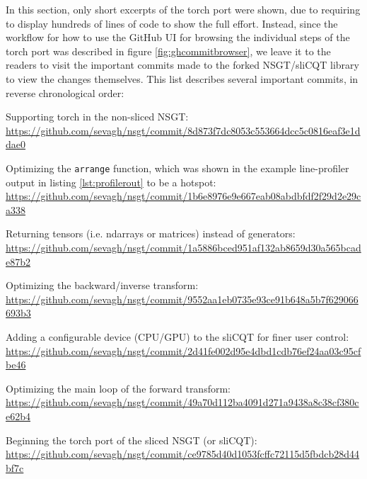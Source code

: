 \documentclass[report.tex]{subfiles}
\begin{document}
In this section, only short excerpts of the torch port were shown, due to requiring to display hundreds of lines of code to show the full effort. Instead, since the workflow for how to use the GitHub UI for browsing the individual steps of the torch port was described in figure \ref{fig:ghcommitbrowser}, we leave it to the readers to visit the important commits made to the forked NSGT/sliCQT library to view the changes themselves. This list describes several important commits, in reverse chronological order:

\begin{tight_enumerate}
	\item
		Supporting torch in the non-sliced NSGT:\\
		{\scriptsize \url{https://github.com/sevagh/nsgt/commit/8d873f7dc8053c553664dcc5c0816eaf3e1ddae0}}
	\item
		 Optimizing the \Verb#arrange# function, which was shown in the example line-profiler output in listing \ref{lst:profilerout} to be a hotspot:\\
		 {\scriptsize \url{https://github.com/sevagh/nsgt/commit/1b6e8976e9e667eab08abdbfdf2f29d2e29ca338}}
	 \item
		 Returning tensors (i.e. ndarrays or matrices) instead of generators:\\
		 {\scriptsize \url{https://github.com/sevagh/nsgt/commit/1a5886bced951af132ab8659d30a565bcade87b2}}
	 \item
		 Optimizing the backward/inverse transform:\\
		 {\scriptsize \url{https://github.com/sevagh/nsgt/commit/9552aa1eb0735e93ce91b648a5b7f629066693b3}}
	 \item
		 Adding a configurable device (CPU/GPU) to the sliCQT for finer user control:\\
		 {\scriptsize \url{https://github.com/sevagh/nsgt/commit/2d41fe002d95e4dbd1cdb76ef24aa03c95cfbe46}}
	 \item
		 Optimizing the main loop of the forward transform:\\
		 {\scriptsize \url{https://github.com/sevagh/nsgt/commit/49a70d112ba4091d271a9438a8c38cf380ce62b4}}
	 \item
		 Beginning the torch port of the sliced NSGT (or sliCQT):\\
		 {\scriptsize \url{https://github.com/sevagh/nsgt/commit/ce9785d40d1053fcffc72115d5fbdcb28d44bf7c}}
\end{tight_enumerate}

\newpagefill
\end{document}
